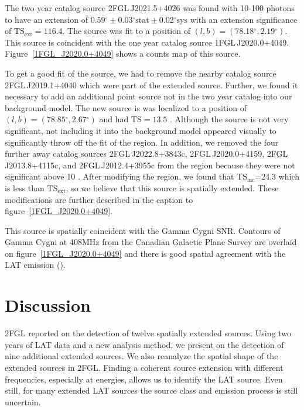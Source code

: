 \documentclass[12pt,preprint]{aastex}
\newcommand{\gev}{\text{GeV}\xspace}
\newcommand{\tev}{\text{TeV}\xspace}
\newcommand{\tsext}{{\ensuremath{\text{TS}_{\text{ext}}}}\xspace}
\newcommand{\tsinc}{\ensuremath{\text{TS}_{\text{inc}}}\xspace}
\newcommand{\ts}{\text{TS}\xspace}
\newcommand{\sys}{\text{sys}\xspace}
\newcommand{\stat}{\text{stat}\xspace}
\renewcommand{\deg}{\ensuremath{^\circ}\xspace}
\begin{document}

The two year catalog source 2FGL\,J2021.5+4026 was found with 10-100 \gev
photons to have an extension of $0.59\deg\pm0.03\deg\stat\pm0.02\deg\sys$
with an extension significance of $\tsext=116.4$.  The source was
fit to a position of $(l,b)=(78.18\deg,2.19\deg)$.  This source
is coincident with the one year catalog source 1FGL\,J2020.0+4049.
Figure~\ref{1FGL_J2020.0+4049} shows a counts map of this source.

To get a good fit of the source, we had to remove the nearby catalog
source 2FGL\,J2019.1+4040 which were part of the extended source.
Further, we found it necessary to add an additional point source not in
the two year catalog into our background model.  The new source is was
localized to a position of $(l,b)=(78.85\deg,2.67\deg)$ and had $\ts=13.5$ .
Although the source is not very significant, not including it into the
background model appeared visually to significantly throw off the fit
of the region.  In addition, we removed the four further away catalog
sources 2FGL\,J2022.8+3843c, 2FGL\,J2020.0+4159, 2FGL\,J2013.8+4115c,
and 2FGL\,J2012.4+3955c from the region because they were not significant
above 10 \gev.  After modifying the region, we found that \tsinc=24.3
which is less than \tsext, so we believe that this source is spatially
extended.  These modifications are further described in the caption to
figure~\ref{1FGL_J2020.0+4049}.

This source is spatially coincident with the Gamma Cygni SNR.  Contours of
Gamma Cygni at 408MHz from the Canadian Galactic Plane Survey are overlaid
on figure~\ref{1FGL_J2020.0+4049} and there is good spatial agreement
with the LAT emission (\cite{canadian_galactic_plane_survey}).


\section{Discussion}

2FGL reported on the detection of twelve spatially extended sources. Using
two years of LAT data and a new analysis method, we present on 
the detection of nine additional extended sources. We also reanalyze
the spatial shape of the extended sources in 2FGL.  Finding a coherent
source extension with different frequencies, especially at \tev energies,
allows us to identify the LAT source. Even still, for many extended LAT
sources the source class and emission process is still uncertain.
\end{document}
